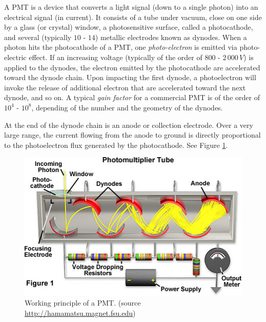 \documentclass[a4,11pt, notitlepage]{article}
\begin{document}
A PMT is a device that converts a light signal (down to a single photon) into an electrical signal (in current). 
It consists of a tube under vacuum, close on one side by a glass (or crystal) window, a photosensitive surface, called a photocathode, and several (typically $10$ - $14$) metallic electrodes known as dynodes.
When a photon hits the photocathode of a PMT,  %
one \emph{photo-electron} is emitted via photo-electric effect. 
If an increasing voltage (typically of the order of $800$ - $2\,000\,V$) is applied to the dynodes, the electron emitted by the photocathode are accelerated toward the dynode chain. 
Upon impacting the first dynode, a photoelectron will invoke the release of additional electron that are accelerated toward the next dynode, and so on. %
A typical \emph{gain factor} for a commercial PMT is of the order of $10^4$ - $10^8$, depending of the number and the geometry of the dynodes. 

At the end of the dynode chain is an anode or collection electrode. Over a very large range, the current flowing from the anode to ground is directly proportional to the photoelectron flux generated by the photocathode. See Figure \ref{fig:PMT}. 
\begin{figure}[htbp]
  \begin{center}
    \includegraphics[width=15.0cm]{figures/photomultiplier.jpg}
    \caption{Working principle of a PMT. (source \url{http://hamamatsu.magnet.fsu.edu})}
\label{fig:PMT}
  \end{center}
\end{figure}
\end{document}
